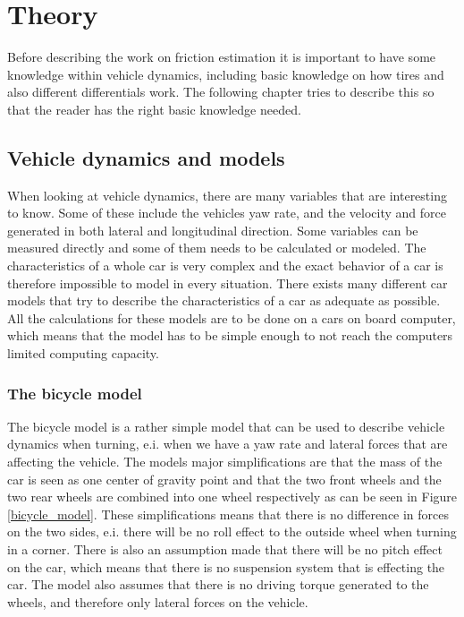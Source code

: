 \chapter{Theory}

Before describing the work on friction estimation it is important to have some knowledge within vehicle dynamics, including basic knowledge on how tires and also different differentials work. The following chapter tries to describe this so that the reader has the right basic knowledge needed.

\section{Vehicle dynamics and models}

When looking at vehicle dynamics, there are many variables that are interesting to know. Some of these include the vehicles yaw rate, and the velocity and force generated in both lateral and longitudinal direction. Some variables can be measured directly and some of them needs to be calculated or modeled. The characteristics of a whole car is very complex and the exact behavior of a car is therefore impossible to model in every situation. There exists many different car models that try to describe the characteristics of a car as adequate as possible. All the calculations for these models are to be done on a cars on board computer, which means that the model has to be simple enough to not reach the computers limited computing capacity.

\subsection{The bicycle model}

The bicycle model is a rather simple model that can be used to describe vehicle dynamics when turning, e.i. when we have a yaw rate and lateral forces that are affecting the vehicle. The models major simplifications are that the mass of the car is seen as one center of gravity point and that the two front wheels and the two rear wheels are combined into one wheel respectively as can be seen in Figure \ref{bicycle_model}. These simplifications means that there is no difference in forces on the two sides, e.i. there will be no roll effect to the outside wheel when turning in a corner. There is also an assumption made that there will be no pitch effect on the car, which means that there is no suspension system that is effecting the car. The model also assumes that there is no driving torque generated to the wheels, and therefore only lateral forces on the vehicle.


